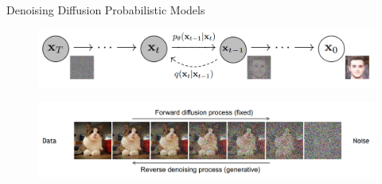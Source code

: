 \begin{frame}[allowframebreaks]{Denoising Diffusion Probabilistic Models}
\begin{figure}
    \centering
    \includegraphics[height=0.8\textheight, width=\textwidth, keepaspectratio]{images/diffusion/diff_3.png}
\end{figure}

\framebreak

\begin{figure}
    \centering
    \includegraphics[height=0.9\textheight, width=\textwidth, keepaspectratio]{images/diffusion/diffusion_1.png}
\end{figure}

\end{frame}